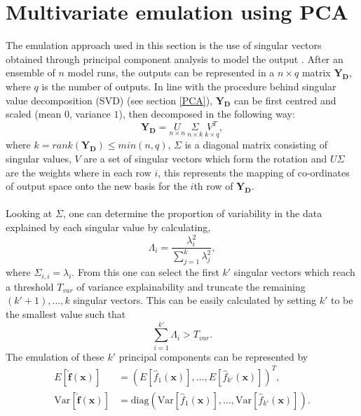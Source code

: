 \documentclass{article}
\newcommand{\numOutputs}{q}
\newcommand{\emulator}{\hat{f}}
\newcommand{\inputVec}{\mathbf{x}}
\newcommand{\outputVec}{\mathbf{y}}
\newcommand{\designOutput}{\outputVec_\design}
\newcommand{\design}{\mathbf{D}}
\newcommand{\numDPs}{n}
\newcommand{\LSingVecs}{U}
\newcommand{\RSingVecs}{V}
\newcommand{\singValMat}{\Sigma}
\newcommand{\singVal}{\lambda}
\newcommand{\varExpl}{\Lambda}
\newcommand{\matRank}{k}
\newcommand{\thresh}{T}
\newcommand{\outputMat}{\mathbf{Y}_\design}%
\begin{document}
\section{Multivariate emulation using PCA}
The emulation approach used in this section is the use of singular vectors obtained through principal component analysis to model the output \citep{Wilkinson_2010,Salter2019,Salter2022,Higdon2008,Sexton2012}. After an ensemble of $\numDPs$ model runs, the outputs can be represented in a $\numDPs \times \numOutputs$ matrix $\outputMat$, where $\numOutputs$ is the number of outputs. In line with the procedure behind singular value decomposition (SVD) (see section \ref{PCA}), $\outputMat$ can be first centred and scaled (mean $0$, variance $1$), then decomposed in the following way:
\begin{equation}
    \nonumber
    \outputMat = \underset{\numDPs \times \numDPs}{\LSingVecs} \ \underset{\numDPs \times \matRank}{\singValMat} \ \underset{\matRank \times \numOutputs}{\RSingVecs^T},
\end{equation}
where $\matRank = rank(\outputMat) \leq min(\numDPs,\numOutputs)$, $\singValMat$ is a diagonal matrix consisting of singular values, $\RSingVecs$ are a set of singular vectors which form the rotation and $\LSingVecs \singValMat$ are the weights where in each row $i$, this represents the mapping of co-ordinates of output space onto the new basis for the $i$th row of $\outputMat$.\\\\
Looking at $\singValMat$, one can determine the proportion of variability in the data explained by each singular value by calculating,
\begin{equation}
    \label{eqn:var_expl}
    \varExpl_i = \frac{\singVal_i^2}{\sum_{j=1}^\matRank \singVal_j^2},
\end{equation}
where $\singValMat_{i,i} = \singVal_i$. From this one can select the first $\matRank'$ singular vectors which reach a threshold $\thresh_{var}$ of variance explainability and truncate the remaining $(\matRank'+1),\dots,\matRank$ singular vectors. This can be easily calculated by setting $\matRank'$ to be the smallest value such that \[\sum_{i=1}^{\matRank'} \varExpl_i > \thresh_{var}.\]
The emulation of these $\matRank'$ principal components can be represented by
\begin{align}
    E\left[\mathbf{\emulator}(\inputVec)\right] &= \left(E\left[\emulator_1(\inputVec)\right],\dots,E\left[\emulator_{\matRank'}(\inputVec)\right] \right)^T, \label{eqn:kdim_mean} \\
    \text{Var}\left[\mathbf{\emulator}(\inputVec)\right] &= \text{diag}\left(\text{Var}\left[\emulator_1(\inputVec)\right],\dots,\text{Var}\left[\emulator_{k'}(\inputVec)\right] \right). \label{eqn:kdim_var}
\end{align}
\end{document}
